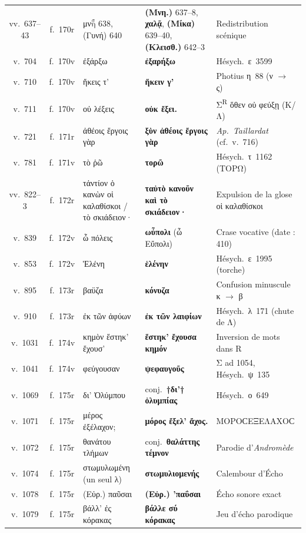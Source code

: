 \documentclass[10pt, a4paper, twoside]{book}
\renewcommand{\_}{\origunderscore\penalty0\relax}
\renewcommand{\texttt}[1]{#1}
\providecommand{\italique}[1]{\emph{#1}}
\providecommand{\lecon}[1]{\textbf{#1}}
\providecommand{\auDessus}[2]{\ensuremath{\overset{\text{#2}}{\text{#1}}}}
\begin{document}
\begin{small}
\begin{longtable}{c c p{3.3cm} p{4.0cm} p{3.8cm}}
vv.~637--43 & \texttt{f.~170r} & μν\auDessus{η}{σ} 638, (Γυνή) 640 & \lecon{(Μνη.)} 637--8, \lecon{χαλᾷ}, \lecon{(Μίκα)} 639--40, \lecon{(Κλεισθ.)} 642--3 & Redistribution scénique \\
v.~704 & \texttt{f.~170v} & ἐξάρξω & \lecon{ἐξαρήξω} & Hésych.~ε~3599 \\
v.~710 & \texttt{f.~170v} & ἥκεις τ' & \lecon{ἥκειν γ'} & Photius η~88 (ν $\to$ ς) \\
v.~711 & \texttt{f.~170v} & οὐ λέξεις & \lecon{οὐκ ἔξει.} & Σ\textsuperscript{R} ὅθεν οὐ φεύξῃ (Κ/Λ) \\
v.~721 & \texttt{f.~171r} & ἀθέοις ἔργοις γὰρ & \lecon{ξὺν ἀθέοις ἔργοις γὰρ} & \italique{Ap.~Taillardat} (cf.~v.~716) \\
v.~781 & \texttt{f.~171v} & τὸ ῥῶ & \lecon{τορῶ} & Hésych.~τ~1162 (ΤΟΡΩ) \\
vv.~822--3 & \texttt{f.~172r} & τἀντίον ὁ κανὼν οἱ καλαθίσκοι / τὸ σκιάδειον· & \lecon{ταὐτὸ κανοῦν καὶ τὸ σκιάδειον·} & Expulsion de la glose οἱ καλαθίσκοι \\
v.~839 & \texttt{f.~172v} & ὦ πόλεις & \lecon{ωὖπολι} (ὦ Εὔπολι) & Crase vocative (date : 410) \\
v.~853 & \texttt{f.~172v} & Ἑλένη & \lecon{ἑλένην} & Hésych.~ε~1995 (torche) \\
v.~895 & \texttt{f.~173r} & βαϋζα & \lecon{κόνυζα} & Confusion minuscule κ $\to$ β \\
v.~910 & \texttt{f.~173r} & ἐκ τῶν ἀφύων & \lecon{ἐκ τῶν λαιφίων} & Hésych.~λ~171 (chute de Λ) \\
v.~1031 & \texttt{f.~174v} & κημὸν ἕστηκ' ἔχουσ' & \lecon{ἕστηκ' ἔχουσα κημόν} & Inversion de mots dans R \\
v.~1041 & \texttt{f.~174v} & φεύγουσαν & \lecon{ψεφαυγοῦς} & Σ ad 1054, Hésych.~ψ~135 \\
v.~1069 & \texttt{f.~175r} & δι' Ὀλύμπου & conj.~\lecon{†δι'† ὀλυμπίας} & Hésych.~ο~649 \\
v.~1071 & \texttt{f.~175r} & μέρος ἐξέλαχον; & \lecon{μόρος ἔξελ' ἄχος.} & ΜΟΡΟϹΕΞΕΛΑΧΟϹ \\
v.~1072 & \texttt{f.~175r} & θανάτου τλήμων & conj.~\lecon{θαλάττης τέμνον} & Parodie d'\italique{Andromède} \\
v.~1074 & \texttt{f.~175r} & στωμυλωμένη (un seul λ) & \lecon{στωμυλιομενής} & Calembour d'Écho \\
v.~1078 & \texttt{f.~175r} & (Εὐρ.) παῦσαι & \lecon{(Εὐρ.) 'παΰσαι} & Écho sonore exact \\
v.~1079 & \texttt{f.~175r} & βάλλ' ἐς κόρακας & \lecon{βάλλε σύ κόρακας} & Jeu d'écho parodique \\

\end{longtable}
\end{small}
\end{document}
